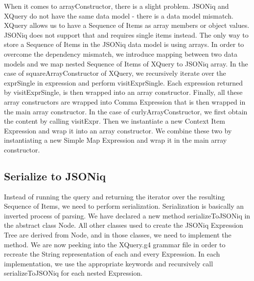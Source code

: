 When it comes to arrayConstructor, there is a slight problem. JSONiq and XQuery do not have the same data model - there is a data model mismatch. XQuery allows us to have a Sequence of Items as array members or object values. JSONiq does not support that and requires single items instead. The only way to store a Sequence of Items in the JSONiq data model is using arrays. In order to overcome the dependency mismatch, we introduce mapping between two data models and we map nested Sequence of Items of XQuery to JSONiq array. In the case of squareArrayConstructor of XQuery, we recursively iterate over the exprSingle in expression and perform visitExprSingle. Each expression returned by visitExprSingle, is then wrapped into an array constructor. Finally, all these array constructors are wrapped into Comma Expression that is then wrapped in the main array constructor. In the case of curlyArrayConstructor, we first obtain the content by calling visitExpr. Then we instantiate a new Context Item Expression and wrap it into an array constructor. We combine these two by instantiating a new Simple Map Expression and wrap it in the main array constructor.

\subsection{Serialize to JSONiq}
Instead of running the query and returning the iterator over the resulting Sequence of Items, we need to perform serialization. Serialization is basically an inverted process of parsing. We have declared a new method serializeToJSONiq in the abstract class Node. All other classes used to create the JSONiq Expression Tree are derived from Node, and in those classes, we need to implement the method. We are now peeking into the XQuery.g4 grammar file in order to recreate the String representation of each and every Expression. In each implementation, we use the appropriate keywords and recursively call serializeToJSONiq for each nested Expression. 

